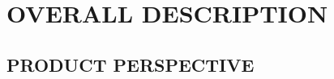 \documentclass[letterpaper, 10pt, draftclsnofoot, compsoc, onecolumn]{IEEEtran}
\begin{document}
\bigskip



\bigskip




\bigskip


\clearpage\section[OVERALL
DESCRIPTION]{\rmfamily\bfseries\color{black}
OVERALL DESCRIPTION}

\subsection[PRODUCT
PERSPECTIVE]{\rmfamily\bfseries\color{black}
PRODUCT PERSPECTIVE}
\end{document}
